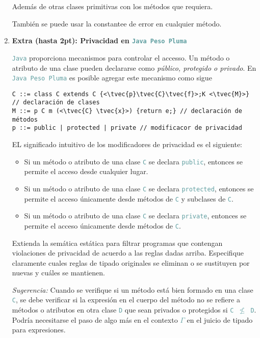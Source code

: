 \documentclass{article}
\newcommand{\tx}[1]{\textcolor{Black} {\texttt{#1}}}
\newcommand{\tp}[1]{\textcolor{CadetBlue} {\texttt{#1}}}
\newcommand{\tb}[1]{\textcolor{RoyalPurple} {\textbf{#1}}}
\newcommand{\ti}[1]{\textcolor{RoyalPurple} {\textit{#1}}}
\newcommand{\pt}[1]{\textcolor{RoyalPurple}{(#1pt)}}
\newcommand{\tvec}[1]{$\vec{\tx{#1}}$ }
\begin{document}
\begin{enumerate}
        Además de otras clases primitivas con los métodos que requiera.

        También se puede usar la constantee de error en cualquier método.

        \item \tb{Extra \pt{hasta 2}: Privacidad en \tp{Java Peso Pluma}}

        \tp{Java} proporciona mecanismos para controlar el accesso. Un método o
        atributo de una clase pueden declararse como \ti{público, protegido o
        privado}. En \tp{Java Peso Pluma} es posible agregar este mecanismo como
        sigue

        \begin{verbatim}
C ::= class C extends C {<\tvec{p}\tvec{C}\tvec{f}>;K <\tvec{M}>} // declaración de clases
M ::= p C m (<\tvec{C} \tvec{x}>) {return e;} // declaración de métodos
p ::= public | protected | private // modificacor de privacidad
        \end{verbatim}

        EL significado intuitivo de los modificadores de privacidad es el
        siguiente:

        \begin{itemize}
            \item Si un método o atributo de una clase \tp{C} se declara
            \tp{public}, entonces se permite el acceso desde cualquier lugar.

            \item Si un método o atributo de una clase \tp{C} se declara
            \tp{protected}, entonces se permite el acceso únicamente desde
            métodos de \tp{C} y subclases de \tp{C}.

            \item Si un método o atributo de una clase \tp{C} se declara
            \tp{private}, entonces se permite el acceso únicamente desde
            métodos de \tp{C}.
        \end{itemize}

        Extienda la semática estática para filtrar programas que contengan
        violaciones de privacidad de acuerdo a las reglas dadas arriba.
        Especifique claramente cuales reglas de tipado originales se eliminan o
        se sustituyen por nuevas y cuáles se mantienen.

        \ti{Sugerencia:} Cuando se verifique si un método está bien formado en
        una clase \tp{C}, se debe verificar si la expresión en el cuerpo del
        método no se refiere a métodos o atributos en otra clase \tp{D} que sean
        privados o protegidos si \tp{C $\not \leq$ D}. Podría necesitarse el
        paso de algo más en el contexto \tp{$\Gamma$} en el juicio de tipado
        para expresiones.


\end{enumerate}
\end{document}
